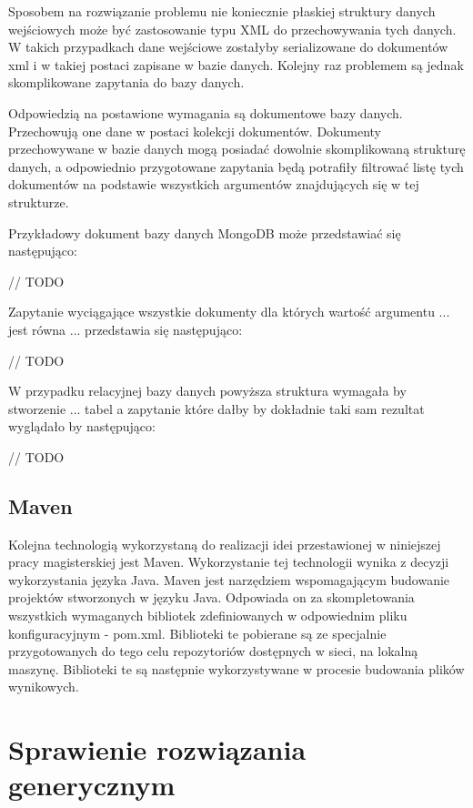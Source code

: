 Sposobem na rozwiązanie problemu nie koniecznie płaskiej struktury danych wejściowych może być zastosowanie typu XML do przechowywania tych danych. W takich przypadkach dane wejściowe zostałyby serializowane do dokumentów xml i w takiej postaci zapisane w bazie danych. Kolejny raz problemem są jednak skomplikowane zapytania do bazy danych. 

Odpowiedzią na postawione wymagania są dokumentowe bazy danych. Przechowują one dane w postaci kolekcji dokumentów. Dokumenty przechowywane w bazie danych mogą posiadać dowolnie skomplikowaną strukturę danych, a odpowiednio przygotowane zapytania będą potrafiły filtrować  listę tych dokumentów na podstawie wszystkich argumentów znajdujących się w tej strukturze. 

Przykładowy dokument bazy danych MongoDB może przedstawiać się następująco:

// TODO

Zapytanie wyciągające wszystkie dokumenty dla których wartość argumentu ... jest równa ... przedstawia się następująco:

// TODO

W przypadku relacyjnej bazy danych powyższa struktura wymagała by stworzenie ... tabel a zapytanie które dałby by dokładnie taki sam rezultat wyglądało by następująco:

// TODO

\subsection{Maven}
Kolejna technologią wykorzystaną do realizacji idei przestawionej w niniejszej pracy magisterskiej jest Maven. Wykorzystanie tej technologii wynika z decyzji wykorzystania języka Java. Maven jest narzędziem wspomagającym budowanie projektów stworzonych w języku Java. Odpowiada on za skompletowania wszystkich wymaganych bibliotek zdefiniowanych w odpowiednim pliku konfiguracyjnym - pom.xml. Biblioteki te pobierane są ze specjalnie przygotowanych do tego celu repozytoriów dostępnych w sieci, na lokalną maszynę. Biblioteki te są następnie wykorzystywane w procesie budowania plików wynikowych.  


\section{Sprawienie rozwiązania generycznym}
\label{sec:generic}

